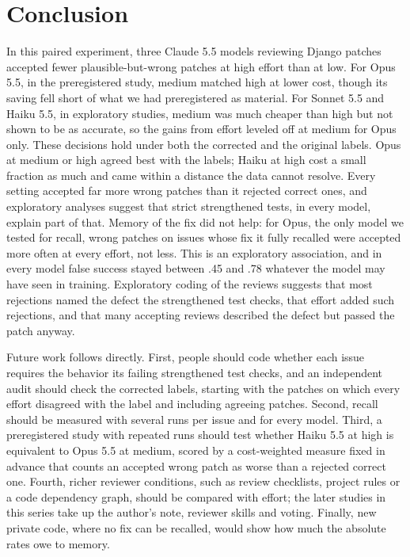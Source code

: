 \documentclass[sigconf,nonacm]{acmart}
\begin{document}
\section{Conclusion}\label{sec:conclusion}

In this paired experiment, three Claude 5.5 models reviewing Django patches accepted fewer plausible-but-wrong patches at high effort than at low. For Opus 5.5, in the preregistered study, medium matched high at lower cost, though its saving fell short of what we had preregistered as material. For Sonnet 5.5 and Haiku 5.5, in exploratory studies, medium was much cheaper than high but not shown to be as accurate, so the gains from effort leveled off at medium for Opus only. These decisions hold under both the corrected and the original labels. Opus at medium or high agreed best with the labels; Haiku at high cost a small fraction as much and came within a distance the data cannot resolve. Every setting accepted far more wrong patches than it rejected correct ones, and exploratory analyses suggest that strict strengthened tests, in every model, explain part of that. Memory of the fix did not help: for Opus, the only model we tested for recall, wrong patches on issues whose fix it fully recalled were accepted more often at every effort, not less. This is an exploratory association, and in every model false success stayed between .45 and .78 whatever the model may have seen in training. Exploratory coding of the reviews suggests that most rejections named the defect the strengthened test checks, that effort added such rejections, and that many accepting reviews described the defect but passed the patch anyway.

Future work follows directly. First, people should code whether each issue requires the behavior its failing strengthened test checks, and an independent audit should check the corrected labels, starting with the patches on which every effort disagreed with the label and including agreeing patches. Second, recall should be measured with several runs per issue and for every model. Third, a preregistered study with repeated runs should test whether Haiku 5.5 at high is equivalent to Opus 5.5 at medium, scored by a cost-weighted measure fixed in advance that counts an accepted wrong patch as worse than a rejected correct one. Fourth, richer reviewer conditions, such as review checklists, project rules or a code dependency graph, should be compared with effort; the later studies in this series take up the author's note, reviewer skills and voting. Finally, new private code, where no fix can be recalled, would show how much the absolute rates owe to memory.
\end{document}
